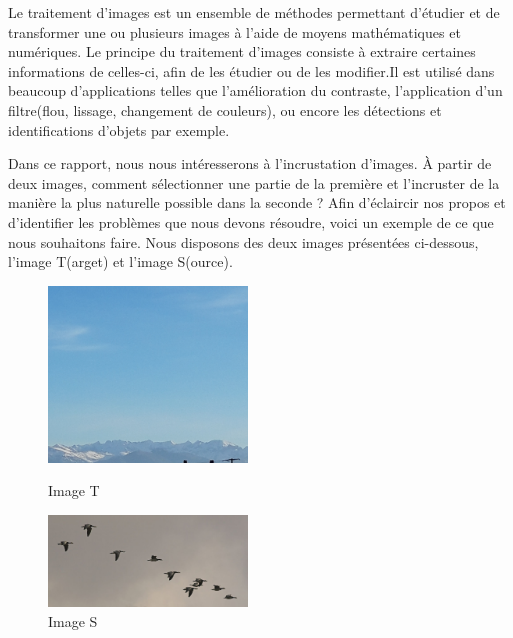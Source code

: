 
Le traitement d'images est un ensemble de méthodes permettant d'étudier et de transformer une ou plusieurs images à l'aide de moyens mathématiques et numériques. Le principe du traitement d'images consiste à extraire certaines informations de celles-ci, afin de les étudier ou de les modifier.Il est utilisé dans beaucoup d'applications telles que l'amélioration du contraste, l'application d'un filtre(flou, lissage, changement de couleurs), ou encore les détections et identifications d'objets par exemple. 

Dans ce rapport, nous nous intéresserons à l'incrustation d'images. À partir de deux images, comment sélectionner une partie de la première et l'incruster de la manière la plus naturelle possible dans la seconde ? 
\newline
Afin d'éclaircir nos propos et d'identifier les problèmes que nous devons résoudre, voici un exemple de ce que nous souhaitons faire.\newline
Nous disposons des deux images présentées ci-dessous, l'image T(arget) et l'image S(ource). 
\newline
\begin{figure}[!htb]
   \begin{minipage}{0.48\textwidth}
     \centering
     \includegraphics[width = 150pt]{Images/Montagne.jpg}
     \caption{Image T}
      \end{minipage}\hfill
   \begin{minipage}{0.48\textwidth}
     \centering
     \includegraphics[width= 150pt]{Images/Oiseau.jpg}
     \caption{Image S}\label{Fig:Data2}
   \end{minipage}
\end{figure}

